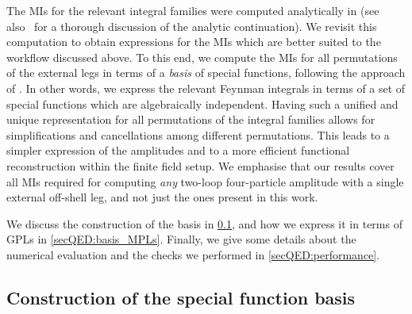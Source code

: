 \documentclass[main.tex]{subfiles}
\begin{document}
The MIs for the relevant integral families were computed analytically in  (see also~ for a thorough discussion of the analytic continuation). We revisit this computation to obtain expressions for the MIs which are better suited to the workflow discussed above. To this end, we compute the MIs for all permutations of the external legs in terms of a \emph{basis} of special functions, following the approach of . In other words, we express the relevant Feynman integrals in terms of a set of special functions which are algebraically independent. Having such a unified and unique representation for all permutations of the integral families allows for simplifications and cancellations among different permutations. This leads to a simpler expression of the amplitudes and to a more efficient functional reconstruction within the finite field setup. We emphasise that our results cover all MIs required for computing \emph{any} two-loop four-particle amplitude with a single external off-shell leg, and not just the ones present in this work.

We discuss the construction of the basis in \cref{secQED:basis_construction}, and how we express it in terms of GPLs in \cref{secQED:basis_MPLs}. 
Finally, we give some details about the numerical evaluation and the checks we performed in \cref{secQED:performance}.


\subsection{Construction of the special function basis}
\label{secQED:basis_construction}
\end{document}
